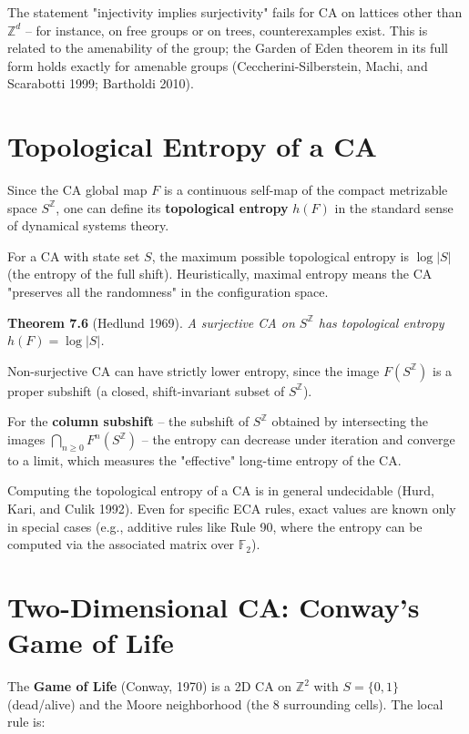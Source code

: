 \begin{remark}
The statement "injectivity implies surjectivity" fails for CA on lattices other than $\mathbb{Z}^d$ -- for instance, on free groups or on trees, counterexamples exist. This is related to the amenability of the group; the Garden of Eden theorem in its full form holds exactly for amenable groups (Ceccherini-Silberstein, Machi, and Scarabotti 1999; Bartholdi 2010).
\end{remark}


\section{Topological Entropy of a CA}

Since the CA global map $F$ is a continuous self-map of the compact metrizable space $S^{\mathbb{Z}}$, one can define its \textbf{topological entropy} $h(F)$ in the standard sense of dynamical systems theory.

For a CA with state set $S$, the maximum possible topological entropy is $\log |S|$ (the entropy of the full shift). Heuristically, maximal entropy means the CA "preserves all the randomness" in the configuration space.

\textbf{Theorem 7.6} (Hedlund 1969). \textit{A surjective CA on $S^{\mathbb{Z}}$ has topological entropy $h(F) = \log |S|$.}

Non-surjective CA can have strictly lower entropy, since the image $F(S^{\mathbb{Z}})$ is a proper subshift (a closed, shift-invariant subset of $S^{\mathbb{Z}}$).

For the \textbf{column subshift} -- the subshift of $S^{\mathbb{Z}}$ obtained by intersecting the images $\bigcap_{n \geq 0} F^n(S^{\mathbb{Z}})$ -- the entropy can decrease under iteration and converge to a limit, which measures the "effective" long-time entropy of the CA.

Computing the topological entropy of a CA is in general undecidable (Hurd, Kari, and Culik 1992). Even for specific ECA rules, exact values are known only in special cases (e.g., additive rules like Rule 90, where the entropy can be computed via the associated matrix over $\mathbb{F}_2$).


\section{Two-Dimensional CA: Conway's Game of Life}

The \textbf{Game of Life} (Conway, 1970) is a 2D CA on $\mathbb{Z}^2$ with $S = \{ 0, 1\} $ (dead/alive) and the Moore neighborhood (the 8 surrounding cells). The local rule is:

